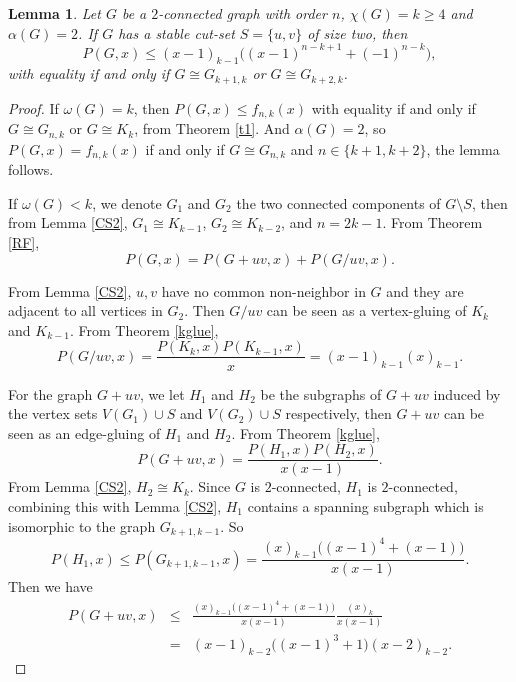 \documentclass[12pt]{article}
\newtheorem{lemma}[theorem]{Lemma}
\theoremstyle{definition}
\begin{document}
\begin{lemma}\label{Min21} Let $G$ be a $2$-connected graph with order $n$, $\chi(G)=k\geq 4$ and $\alpha(G)=2$. If $G$ has a stable cut-set $S=\{u,v\}$ of size two, then $$P(G,x)\leq(x-1)_{k-1}\big((x-1)^{n-k+1}+(-1)^{n-k}\big),$$ with equality  if and only if $G\cong G_{k+1,k}$ or $G\cong G_{k+2,k}$.
\end{lemma}

\begin{proof} If $\omega(G)=k$, then $P(G,x)\leq f_{n,k}(x)$ with equality if and only if $G\cong G_{n,k}$ or $G\cong K_k$, from Theorem \ref{t1}.
 And $\alpha(G)=2$, so $P(G,x)=f_{n,k}(x)$ if and only if $G\cong G_{n,k}$ and $n\in \{k+1,k+2\}$, the lemma follows.

If $\omega(G)< k$, we denote $G_1$ and $G_2$ the two connected components of $G\setminus S$, then from Lemma \ref{CS2}, $G_1\cong K_{k-1}$, $G_2\cong K_{k-2}$, and $n=2k-1$. From Theorem \ref{RF},
\begin{equation}\label{F}
P(G,x)=P(G+uv, x)+P(G/uv, x).
\end{equation}

From Lemma \ref{CS2}, $u,v$ have no common non-neighbor in $G$ and they are adjacent to all vertices in $G_2$.
Then $G/uv$ can be seen as a vertex-gluing of $K_{k}$ and $K_{k-1}$. From Theorem \ref{kglue},
\begin{equation}\label{C}
P(G/uv, x)=\frac{P(K_{k},x)P(K_{k-1},x)}{x}=(x-1)_{k-1} (x)_{k-1}.
\end{equation}

For the graph $G+uv$, we let $H_1$ and $H_2$ be the subgraphs of $G+uv$ induced by the vertex sets $V(G_1)\cup S$ and  $V(G_2)\cup S$ respectively, then $G+uv$ can be seen as an edge-gluing of $H_{1}$ and $H_{2}$. From Theorem \ref{kglue},
\begin{equation*}
P(G+uv, x)=\frac{P(H_1,x)P(H_2,x)}{x(x-1)}.
\end{equation*}
 From Lemma \ref{CS2}, $H_2\cong K_k$. Since $G$ is $2$-connected, $H_1$ is $2$-connected, combining this with Lemma \ref{CS2}, $H_1$ contains a spanning subgraph which is isomorphic to the graph $G_{k+1,k-1}$. So $$P(H_1,x)\leq P(G_{k+1,k-1},x)=\frac{(x)_{k-1}\big((x-1)^4+(x-1)\big)}{x(x-1)}.$$ Then we have
\begin{eqnarray}\label{A}
P(G+uv, x)&\leq&\frac{(x)_{k-1}\big((x-1)^4+(x-1)\big)}{x(x-1)}\frac{(x)_k}{x(x-1)}\nonumber\\
&=&(x-1)_{k-2}\big((x-1)^3+1\big)(x-2)_{k-2}.
\end{eqnarray}


\end{proof}
\end{document}
